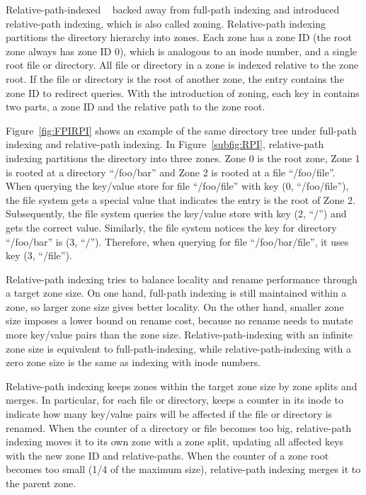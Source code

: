 Relative-path-indexed \betrfs~\citep{betrfs2,betrfs2tos} backed away from
full-path indexing and introduced relative-path indexing,
which is also called zoning.
Relative-path indexing partitions the directory hierarchy into zones.
Each zone has a zone ID (the root zone always has zone ID 0), which is analogous
to an inode number, and a single root file or directory.
All file or directory in a zone is indexed relative to the zone root.
If the file or directory is the root of another zone, the entry contains the
zone ID to redirect queries.
With the introduction of zoning, each key in \betrfs contains two parts,
a zone ID and the relative path to the zone root.

Figure~\ref{fig:FPIRPI} shows an example of the same directory tree under
full-path indexing and relative-path indexing.
In Figure~\ref{subfig:RPI}, relative-path indexing partitions the directory
into three zones.
Zone 0 is the root zone, Zone 1 is rooted at a directory ``/foo/bar'' and
Zone 2 is rooted at a file ``/foo/file''.
When querying the key/value store for file ``/foo/file'' with key
(0, ``/foo/file''), the file system gets a special value that
indicates the entry is the root of Zone 2.
Subsequently, the file system queries the key/value store with key (2, ``/'')
and gets the correct value.
Similarly, the file system notices the key for directory ``/foo/bar'' is
(3, ``/'').
Therefore, when querying for file ``/foo/bar/file'', it uses key (3, ``/file'').

Relative-path indexing tries to balance locality and rename performance through
a target zone size.
On one hand, full-path indexing is still maintained within a zone,
so larger zone size gives better locality.
On the other hand, smaller zone size imposes a lower bound on rename cost,
because no rename needs to mutate more key/value pairs than the zone size.
Relative-path-indexing with an infinite zone size is equivalent to
full-path-indexing, while relative-path-indexing with a zero zone size is the
same as indexing with inode numbers.

Relative-path indexing keeps zones within the target zone size by zone splits
and merges.
In particular, for each file or directory, \betrfs keeps a counter in its inode
to indicate how many key/value pairs will be affected if the file or directory
is renamed.
When the counter of a directory or file becomes too big,
relative-path indexing moves it to its own zone with a zone split,
updating all affected keys with the new zone ID and relative-paths.
When the counter of a zone root becomes too small (1/4 of the maximum
size), relative-path indexing merges it to the parent zone.

